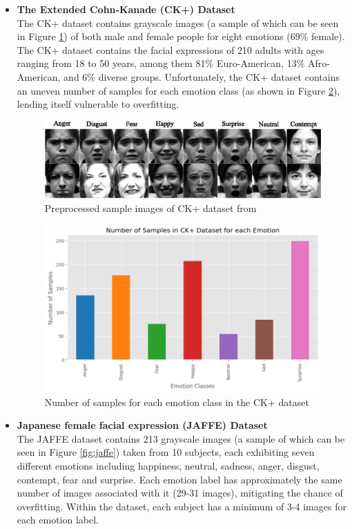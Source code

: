 \documentclass[12pt, a4paper]{article}
\newcommand{\np}
    {
    \vskip 0.4cm
    }
\begin{document}
\begin{itemize}
    \item \textbf{The Extended Cohn-Kanade (CK+) Dataset} \citep{lucey2010extended} \\ The CK+ dataset contains grayscale images (a sample of which can be seen in Figure \ref{fig:ckds}) of both male and female people for eight emotions (69\% female). The CK+ dataset contains the facial expressions of 210 adults with ages ranging from 18 to 50 years, among them 81\% Euro-American, 13\% Afro-American, and 6\% diverse groups. Unfortunately, the CK+ dataset contains an uneven number of samples for each emotion class (as shown in Figure \ref{fig:ckeda}), lending itself vulnerable to overfitting. 
    \np
    \begin{figure}[H]
        \centering
        \includegraphics[scale=1]{images/ck.png}
        \caption{Preprocessed sample images of CK+ dataset from \cite{kar2019face}}
        \label{fig:ckds}
    \end{figure}
    
    \begin{figure}[H]
        \centering
        \includegraphics[scale=0.60]{images/ckeda.png}
        \caption{Number of samples for each emotion class in the CK+ dataset}
        \label{fig:ckeda}
    \end{figure}

    \item \textbf{Japanese female facial expression (JAFFE) Dataset} \citep{lyons1998coding} \\ The JAFFE dataset contains 213 grayscale images (a sample of which can be seen in Figure \ref{fig:jaffe}) taken from 10 subjects, each exhibiting seven different emotions including happiness, neutral, sadness, anger, disgust, contempt, fear and surprise. Each emotion label has approximately the same number of images associated with it (29-31 images), mitigating the chance of overfitting. Within the dataset, each subject has a minimum of 3-4 images for each emotion label.
    \np
    

\end{itemize}
\end{document}
